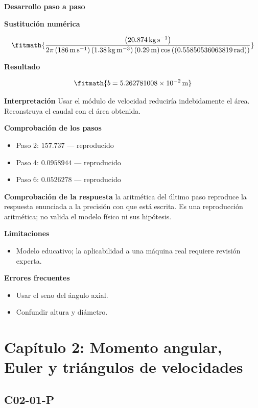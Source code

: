 \documentclass[10pt,openany]{book}
\begin{document}
\noindent\textbf{Desarrollo paso a paso}



\noindent\textbf{Sustitución numérica}

\[
\fitmath{\frac{\left(20.874\,\mathrm{kg}\,\mathrm{s}^{-1}\right)}{2 \pi \left(186\,\mathrm{m}\,\mathrm{s}^{-1}\right) \left(1.38\,\mathrm{kg}\,\mathrm{m}^{-3}\right) \left(0.29\,\mathrm{m}\right) \cos{\left(\left(0.55850536063819\,\mathrm{rad}\right) \right)}}}
\]

\noindent\textbf{Resultado}

\[
\fitmath{b=5.262781008\times10^{-2}\,\mathrm{m}}
\]

\noindent\textbf{Interpretación}
Usar el módulo de velocidad reduciría indebidamente el área. Reconstruya el caudal con el área obtenida.

\noindent\textbf{Comprobación de los pasos}
\begin{itemize}
\item Paso 2: $157.737$ — reproducido
\item Paso 4: $0.0958944$ — reproducido
\item Paso 6: $0.0526278$ — reproducido
\end{itemize}

\noindent\textbf{Comprobación de la respuesta} la aritmética del último paso reproduce la respuesta enunciada a la precisión con que está escrita. Es una reproducción aritmética; no valida el modelo físico ni sus hipótesis.

\noindent\textbf{Limitaciones}
\begin{itemize}
\item Modelo educativo; la aplicabilidad a una máquina real requiere revisión experta.
\end{itemize}

\noindent\textbf{Errores frecuentes}
\begin{itemize}
\item Usar el seno del ángulo axial.
\item Confundir altura y diámetro.
\end{itemize}
\section{Capítulo 2: Momento angular, Euler y triángulos de velocidades}
\subsection*{C02-01-P}
\end{document}
